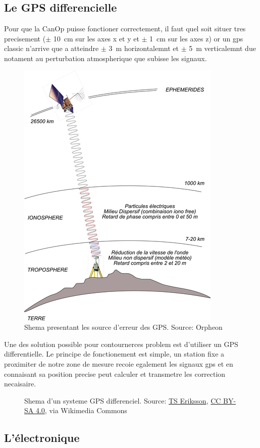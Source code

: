 \subsection{Le GPS differencielle}
\label{ssec:Gps_differenciel}
Pour que la CanOp puisse fonctioner correctement, il faut quel soit situer tres precisement ($\pm$ 10~cm sur les axes x et y et $\pm$ 1~cm sur les axes z) or un gps classic n'arrive que a atteindre $\pm$ 3~m horizontalemnt et $\pm$ 5~m verticalemnt due notament au perturbation atmospherique que subisse les signaux. 
\begin{figure}
    \centering
    \includegraphics{img/she/GPS-mode-Naturel-5-10m.png}
    \caption{Shema presentant les source d'erreur des GPS. Source: Orpheon}
    \label{fig:GPS_error_source}
\end{figure}

Une des solution possible pour contournerces problem est d'utiliser un GPS differentielle. Le principe de fonctionement est simple, un station fixe a proximiter de notre zone de mesure recoie egalement les signaux gps et en connaisant sa position precise peut calculer et transmetre les correction necaisaire. \cite{site:GPS_diff}
\begin{figure}
    \centering
    
    \caption[Shema d'un systeme GPS differenciel]{Shema d'un systeme GPS differenciel. Source: \href{https://commons.wikimedia.org/wiki/File:Real_time_kinematic.svg}{TS Eriksson}, \href{https://creativecommons.org/licenses/by-sa/4.0}{CC BY-SA 4.0}, via Wikimedia Commons}
    \label{fig:RTK}
\end{figure}

\subsection{L'électronique}

    